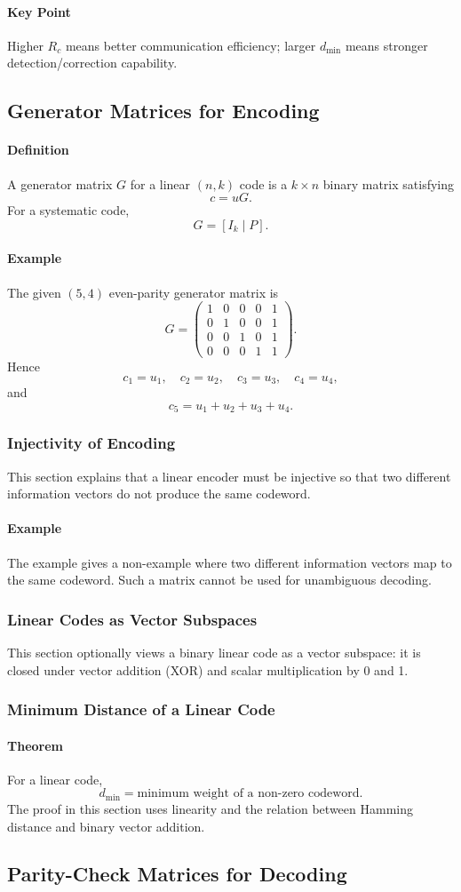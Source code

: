 \documentclass[12pt]{article}
\newcommand{\Definition}{\paragraph{Definition}}
\newcommand{\Example}{\paragraph{Example}}
\newcommand{\KeyPoint}{\paragraph{Key Point}}
\newcommand{\Theorem}{\paragraph{Theorem}}
\begin{document}
\KeyPoint Higher $R_c$ means better communication efficiency; larger $d_{\min}$ means stronger detection/correction capability.

\subsection{Generator Matrices for Encoding}
\Definition A generator matrix $G$ for a linear $(n,k)$ code is a $k\times n$ binary matrix satisfying
\[
c=uG.
\]
For a systematic code,
\[
G=[I_k\mid P].
\]

\Example The given $(5,4)$ even-parity generator matrix is
\[
G=
\begin{pmatrix}
1&0&0&0&1\\
0&1&0&0&1\\
0&0&1&0&1\\
0&0&0&1&1
\end{pmatrix}.
\]
Hence
\[
c_1=u_1,\quad c_2=u_2,\quad c_3=u_3,\quad c_4=u_4,
\]
and
\[
c_5=u_1+u_2+u_3+u_4.
\]

\subsubsection{Injectivity of Encoding}
This section explains that a linear encoder must be injective so that two different information vectors do not produce the same codeword.

\Example The example gives a non-example where two different information vectors map to the same codeword. Such a matrix cannot be used for unambiguous decoding.

\subsubsection{Linear Codes as Vector Subspaces}
This section optionally views a binary linear code as a vector subspace: it is closed under vector addition (XOR) and scalar multiplication by 0 and 1.

\subsubsection{Minimum Distance of a Linear Code}
\Theorem For a linear code,
\[
d_{\min}=\text{minimum weight of a non-zero codeword}.
\]
The proof in this section uses linearity and the relation between Hamming distance and binary vector addition.

\subsection{Parity-Check Matrices for Decoding}
\end{document}
